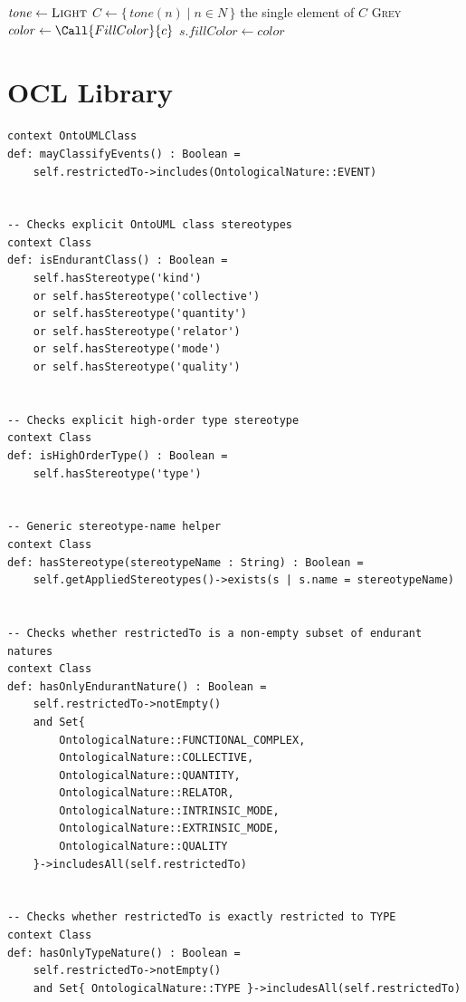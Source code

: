 \begin{algorithm}[htbp]
\begin{algorithmic}[1]
      \Else
        \State $\mathit{tone} \gets \textsc{Light}$
      \EndIf
      \State $C \gets \{\, \mathit{tone}(n) \mid n \in N \,\}$ 
        \State \Return the single element of $C$ 
      \Else
        \State \Return \textsc{Grey} 
      \EndIf
    \EndFunction
    \Statex
      \State $\mathit{color} \gets \Call{FillColor}{c}$
          \State $s.\mathit{fillColor} \gets \mathit{color}$
        \EndFor
      \EndIf
    \EndProcedure
  \end{algorithmic}
\end{algorithm}


\chapter{OCL Library}

\begin{lstlisting}[language=OCL]
context OntoUMLClass
def: mayClassifyEvents() : Boolean =
    self.restrictedTo->includes(OntologicalNature::EVENT)


-- Checks explicit OntoUML class stereotypes
context Class
def: isEndurantClass() : Boolean =
    self.hasStereotype('kind')
    or self.hasStereotype('collective')
    or self.hasStereotype('quantity')
    or self.hasStereotype('relator')
    or self.hasStereotype('mode')
    or self.hasStereotype('quality')


-- Checks explicit high-order type stereotype
context Class
def: isHighOrderType() : Boolean =
    self.hasStereotype('type')


-- Generic stereotype-name helper
context Class
def: hasStereotype(stereotypeName : String) : Boolean =
    self.getAppliedStereotypes()->exists(s | s.name = stereotypeName)


-- Checks whether restrictedTo is a non-empty subset of endurant natures
context Class
def: hasOnlyEndurantNature() : Boolean =
    self.restrictedTo->notEmpty()
    and Set{
        OntologicalNature::FUNCTIONAL_COMPLEX,
        OntologicalNature::COLLECTIVE,
        OntologicalNature::QUANTITY,
        OntologicalNature::RELATOR,
        OntologicalNature::INTRINSIC_MODE,
        OntologicalNature::EXTRINSIC_MODE,
        OntologicalNature::QUALITY
    }->includesAll(self.restrictedTo)


-- Checks whether restrictedTo is exactly restricted to TYPE
context Class
def: hasOnlyTypeNature() : Boolean =
    self.restrictedTo->notEmpty()
    and Set{ OntologicalNature::TYPE }->includesAll(self.restrictedTo)

    
\end{lstlisting}